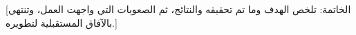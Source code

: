 \documentclass[12pt,letterpaper,oneside]{report}
\begin{document}
\setcounter{page}{1}


%
%




[الخاتمة: تلخص الهدف وما تم تحقيقه والنتائج، ثم الصعوبات التي واجهت العمل،
وتنتهي بالآفاق المستقبلية لتطويره.]
\clearpage


\end{document}
